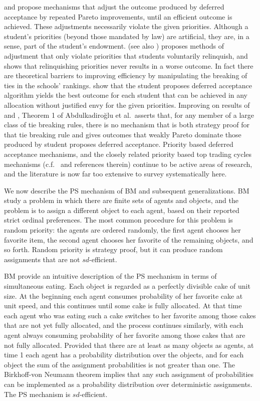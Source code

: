 \documentclass[12pt]{article}
\theoremstyle{definition}
\begin{document}
\cite{ee08aer} and \cite{ku15te} propose mechanisms that adjust the outcome produced by deferred acceptance by repeated Pareto improvements, until an efficient outcome is achieved.  These adjustments necessarily violate the given priorities.  Although a student's priorities (beyond those mandated by law) are artificial, they are, in a sense, part of the student's endowment.  \cite{kesten10qje} (see also \cite{TaYu14}) proposes methods of adjustment that only violate priorities that students voluntarily relinquish, and shows that relinquishing priorities never results in a worse outcome.  In fact there are theoretical barriers to improving efficiency by manipulating the breaking of ties in the schools' rankings.  \cite{GaSh62} show that the student proposes deferred acceptance algorithm yields the best outcome for each student that can be achieved in any allocation without justified envy for the given priorities.   
Improving on results of \cite{kesten06jet} and \cite{ee08aer}, Theorem 1 of Abdulkadiro{\u{g}}lu et al.~asserts that, for any member of a large class of tie breaking rules, there is no mechanism that is both strategy proof for that tie breaking rule and gives outcomes that weakly Pareto dominate those produced by student proposes deferred acceptance.  
Priority based deferred acceptance mechanisms, and the closely related priority based top trading cycles mechanisms (c.f.~\cite{acprt20aeri} and references therein) continue to be active areas of research, and the literature is now far too extensive to survey systematically here.

We now describe the PS mechanism of BM and subsequent generalizations.  BM study a problem in which there are finite sets of agents and objects, and the problem is to assign a different object to each agent, based on their reported strict ordinal preferences.  The most common procedure for this problem is random priority: the agents are ordered randomly, the first agent chooses her favorite item, the second agent chooses her favorite of the remaining objects, and so forth.  Random priority is strategy proof, but it can produce random assignments that are not $sd$-efficient.

BM provide an intuitive description of the PS mechanism in terms of simultaneous eating.  Each object is regarded as a perfectly divisible cake of unit size.  At the beginning each agent consumes probability of her favorite cake at unit speed, and this continues until some cake is fully allocated.  At that time each agent who was eating such a cake switches to her favorite among those cakes that are not yet fully allocated, and the process continues similarly, with each agent always consuming probability of her favorite among those cakes that are not fully allocated.  Provided that there are at least as many objects as agents, at time 1 each agent has a probability distribution over the objects, and for each object the sum of the assignment probabilities is not greater than one.  The Birkhoff-von Neumann theorem implies that any such assignment of probabilities can be implemented as a probability distribution over deterministic assignments.  The PS mechanism is $sd$-efficient.
\end{document}
